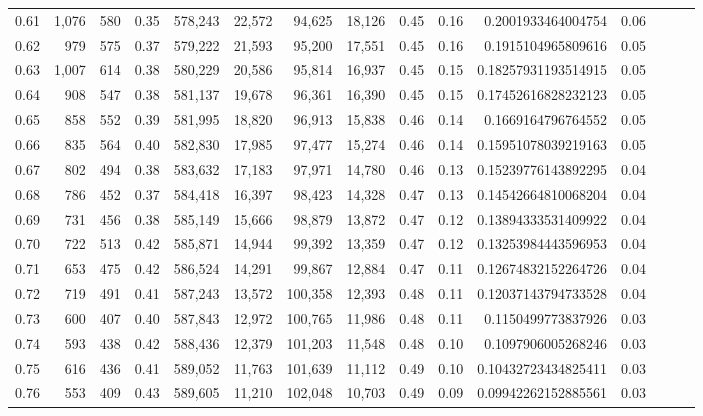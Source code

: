 \begin{tabular}{rrrrrrrrrrrrrrr}
0.61 &   1,076 &    580 &  0.35 &  578,243 &   22,572 &   94,625 &   18,126 &  0.45 &  0.16 &    0.2001933464004754 &      0.06 \\
0.62 &     979 &    575 &  0.37 &  579,222 &   21,593 &   95,200 &   17,551 &  0.45 &  0.16 &    0.1915104965809616 &      0.05 \\
0.63 &   1,007 &    614 &  0.38 &  580,229 &   20,586 &   95,814 &   16,937 &  0.45 &  0.15 &   0.18257931193514915 &      0.05 \\
0.64 &     908 &    547 &  0.38 &  581,137 &   19,678 &   96,361 &   16,390 &  0.45 &  0.15 &   0.17452616828232123 &      0.05 \\
0.65 &     858 &    552 &  0.39 &  581,995 &   18,820 &   96,913 &   15,838 &  0.46 &  0.14 &    0.1669164796764552 &      0.05 \\
0.66 &     835 &    564 &  0.40 &  582,830 &   17,985 &   97,477 &   15,274 &  0.46 &  0.14 &   0.15951078039219163 &      0.05 \\
0.67 &     802 &    494 &  0.38 &  583,632 &   17,183 &   97,971 &   14,780 &  0.46 &  0.13 &   0.15239776143892295 &      0.04 \\
0.68 &     786 &    452 &  0.37 &  584,418 &   16,397 &   98,423 &   14,328 &  0.47 &  0.13 &   0.14542664810068204 &      0.04 \\
0.69 &     731 &    456 &  0.38 &  585,149 &   15,666 &   98,879 &   13,872 &  0.47 &  0.12 &   0.13894333531409922 &      0.04 \\
0.70 &     722 &    513 &  0.42 &  585,871 &   14,944 &   99,392 &   13,359 &  0.47 &  0.12 &   0.13253984443596953 &      0.04 \\
0.71 &     653 &    475 &  0.42 &  586,524 &   14,291 &   99,867 &   12,884 &  0.47 &  0.11 &   0.12674832152264726 &      0.04 \\
0.72 &     719 &    491 &  0.41 &  587,243 &   13,572 &  100,358 &   12,393 &  0.48 &  0.11 &   0.12037143794733528 &      0.04 \\
0.73 &     600 &    407 &  0.40 &  587,843 &   12,972 &  100,765 &   11,986 &  0.48 &  0.11 &    0.1150499773837926 &      0.03 \\
0.74 &     593 &    438 &  0.42 &  588,436 &   12,379 &  101,203 &   11,548 &  0.48 &  0.10 &    0.1097906005268246 &      0.03 \\
0.75 &     616 &    436 &  0.41 &  589,052 &   11,763 &  101,639 &   11,112 &  0.49 &  0.10 &   0.10432723434825411 &      0.03 \\
0.76 &     553 &    409 &  0.43 &  589,605 &   11,210 &  102,048 &   10,703 &  0.49 &  0.09 &   0.09942262152885561 &      0.03 \\

\end{tabular}
